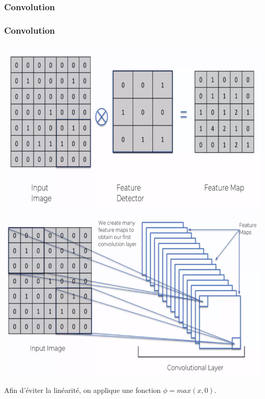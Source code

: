 \documentclass[11pt]{beamer}
\begin{document}
\subsubsection{Convolution}
\begin{frame}
\frametitle{Convolution}

\includegraphics[scale=0.17]{img10.png}
\includegraphics[scale=0.17]{img11.png}

Afin d'éviter la linéarité, on applique une fonction $\phi = max(x, 0)$.
\end{frame}
\end{document}
